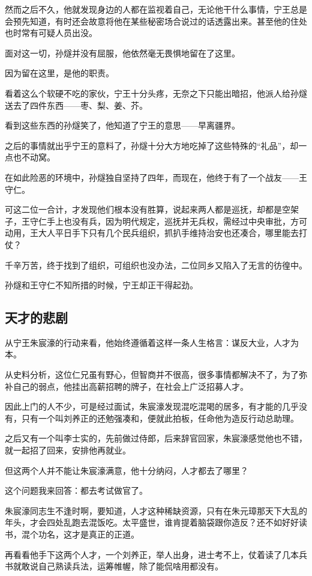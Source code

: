 \begin{multicols}{\theparacolNo}
		然而之后不久，他就发现身边的人都在监视着自己，无论他干什么事情，宁王总是会预先知道，有时还会故意将他在某些秘密场合说过的话透露出来。甚至他的住处也时常有可疑人员出没。

		面对这一切，孙燧并没有屈服，他依然毫无畏惧地留在了这里。

		因为留在这里，是他的职责。

		看着这么个软硬不吃的家伙，宁王十分头疼，无奈之下只能出暗招，他派人给孙燧送去了四件东西——枣、梨、姜、芥。

		看到这些东西的孙燧笑了，他知道了宁王的意思——早离疆界。

		之后的事情就出乎宁王的意料了，孙燧十分大方地吃掉了这些特殊的“礼品”，却一点也不动窝。

		在如此险恶的环境中，孙燧独自坚持了四年，而现在，他终于有了一个战友——王守仁。

		可这二位一合计，才发现他们根本没有胜算，说起来两人都是巡抚，却都是空架子，王守仁手上也没有兵，因为明代规定，巡抚并无兵权，需经过中央审批，方可动用，王大人平日手下只有几个民兵组织，抓扒手维持治安也还凑合，哪里能去打仗？

		千辛万苦，终于找到了组织，可组织也没办法，二位同乡又陷入了无言的彷徨中。

		孙燧和王守仁不知所措的时候，宁王却正干得起劲。

		\subsection{天才的悲剧}
		从宁王朱宸濠的行动来看，他始终遵循着这样一条人生格言：谋反大业，人才为本。

		从史料分析，这位仁兄虽有野心，但智商并不很高，很多事情都解决不了，为了弥补自己的弱点，他挂出高薪招聘的牌子，在社会上广泛招募人才。

		因此上门的人不少，可是经过面试，朱宸濠发现混吃混喝的居多，有才能的几乎没有，只有一个叫刘养正的还勉强凑和，便就此拍板，任命他为造反行动总助理。

		之后又有一个叫李士实的，先前做过侍郎，后来辞官回家，朱宸濠感觉他也不错，就一起招了回来，安排他再就业。

		但这两个人并不能让朱宸濠满意，他十分纳闷，人才都去了哪里？

		这个问题我来回答：都去考试做官了。

		朱宸濠同志生不逢时啊，要知道，人才这种稀缺资源，只有在朱元璋那天下大乱的年头，才会四处乱跑去混饭吃。太平盛世，谁肯提着脑袋跟你造反？还不如好好读书，混个功名，这才是真正的正道。

		再看看他手下这两个人才，一个刘养正，举人出身，进士考不上，仗着读了几本兵书就敢说自己熟读兵法，运筹帷幄，除了能侃啥用都没有。


\end{multicols}
